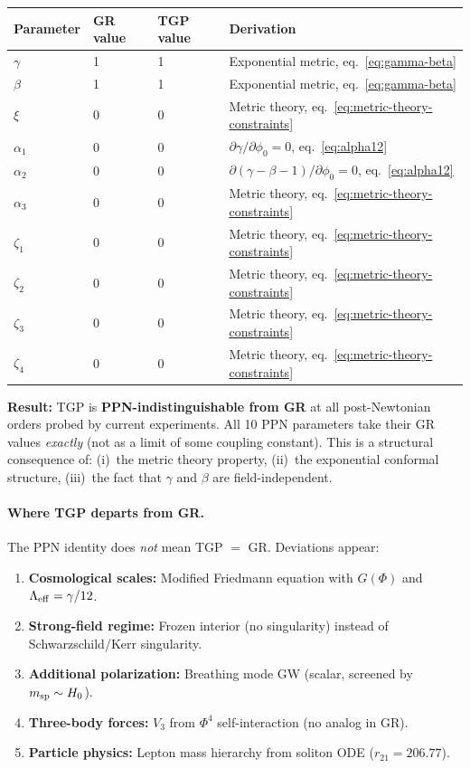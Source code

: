 \begin{center}
\begin{tabular}{@{}llll@{}}
\toprule
\textbf{Parameter} & \textbf{GR value} & \textbf{TGP value} & \textbf{Derivation} \\
\midrule
$\gamma$   & 1 & 1 & Exponential metric, eq.~\eqref{eq:gamma-beta} \\
$\beta$    & 1 & 1 & Exponential metric, eq.~\eqref{eq:gamma-beta} \\
$\xi$      & 0 & 0 & Metric theory, eq.~\eqref{eq:metric-theory-constraints} \\
$\alpha_1$ & 0 & 0 & $\partial\gamma/\partial\phi_0 = 0$, eq.~\eqref{eq:alpha12} \\
$\alpha_2$ & 0 & 0 & $\partial(\gamma{-}\beta{-}1)/\partial\phi_0 = 0$, eq.~\eqref{eq:alpha12} \\
$\alpha_3$ & 0 & 0 & Metric theory, eq.~\eqref{eq:metric-theory-constraints} \\
$\zeta_1$  & 0 & 0 & Metric theory, eq.~\eqref{eq:metric-theory-constraints} \\
$\zeta_2$  & 0 & 0 & Metric theory, eq.~\eqref{eq:metric-theory-constraints} \\
$\zeta_3$  & 0 & 0 & Metric theory, eq.~\eqref{eq:metric-theory-constraints} \\
$\zeta_4$  & 0 & 0 & Metric theory, eq.~\eqref{eq:metric-theory-constraints} \\
\bottomrule
\end{tabular}
\end{center}

\medskip
\noindent\textbf{Result:}
TGP is \textbf{PPN-indistinguishable from GR} at all post-Newtonian
orders probed by current experiments.  All 10 PPN parameters take
their GR values \emph{exactly} (not as a limit of some coupling
constant).  This is a structural consequence of: (i)~the metric
theory property, (ii)~the exponential conformal structure,
(iii)~the fact that $\gamma$ and $\beta$ are field-independent.

\paragraph{Where TGP departs from GR.}
The PPN identity does \emph{not} mean TGP $=$ GR.  Deviations appear:
\begin{enumerate}[nosep]
  \item \textbf{Cosmological scales:} Modified Friedmann equation
        with $G(\Phi)$ and $\Lambda_{\rm eff} = \gamma/12$.
  \item \textbf{Strong-field regime:} Frozen interior (no singularity)
        instead of Schwarzschild/Kerr singularity.
  \item \textbf{Additional polarization:} Breathing mode GW (scalar,
        screened by $m_{\rm sp} \sim H_0$).
  \item \textbf{Three-body forces:} $V_3$ from $\Phi^4$ self-interaction
        (no analog in GR).
  \item \textbf{Particle physics:} Lepton mass hierarchy from soliton
        ODE ($r_{21} = 206.77$).
\end{enumerate}

